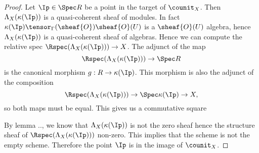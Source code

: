\begin{proof}
Let $\Ip\in \Spec R$ be a point in the target of $\counit_X$.
Then $\Lambda_X(\kappa(\Ip))$ is a quasi-coherent sheaf of modules.
In fact $\kappa(\Ip)\tensor_\Gamma(\sheaf{O}) \sheaf{O}(U)$ is a $\sheaf{O}(U)$ algebra, hence $\Lambda_X(\kappa(\Ip))$ is a quasi-coherent sheaf of algebras.
Hence we can compute the relative spec $\Rspec(\Lambda_X(\kappa(\Ip)))\rightarrow X$. The adjunct of the map
\[\Rspec(\Lambda_X(\kappa(\Ip)))\rightarrow \Spec R\] is the canonical morphism $g:R\rightarrow \kappa(\Ip)$. 
This morphism is also the adjunct of the composition
\[\Rspec(\Lambda_X(\kappa(\Ip)))\rightarrow \Spec \kappa(\Ip)\rightarrow X,\]
so both maps must be equal. This gives us a commutative square

\begin{center}
\end{center}

By lemma .., we know that $\Lambda_X(\kappa(\Ip))$ is not the zero sheaf hence the structure sheaf of $\Rspec(\Lambda_X(\kappa(\Ip)))$ non-zero.
This implies that the scheme is not the empty scheme. Therefore the point $\Ip$ is in the image of $\counit_X$.
\end{proof}